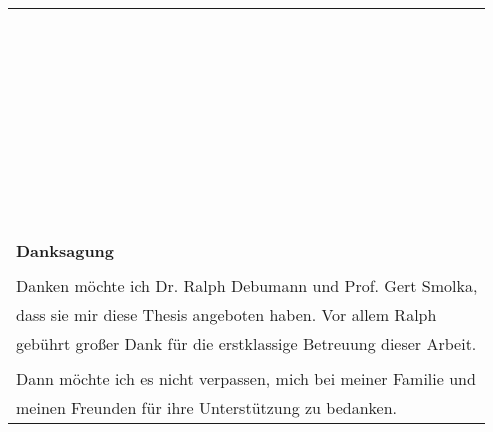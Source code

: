 \begin{titlepage}
\begin{flushleft}
\begin{tabular}{l}
  \end{tabular}
\end{flushleft}

\pagebreak


\pagestyle{empty}

\begin{flushleft}
  \begin{tabular}{l}
    \\\\\\\\\\\\\\\\
    \\\\\\\\\\\\\\\\
    \\\\\\\\\\\\\\\\
    \\\\\\\\\\\\\\\\
    \\\\\\\\\\\\\\
    {\Large{\bf Danksagung}}\\\\
    {\Large{Danken m\"ochte ich Dr. Ralph Debumann und Prof. Gert
        Smolka,}}\\
    {\Large{dass sie mir diese Thesis angeboten haben. Vor allem Ralph}}\\ 
    {\Large{geb\"uhrt gro{\ss}er Dank f\"ur die erstklassige Betreuung dieser Arbeit.}}\\\\
    {\Large{Dann m\"ochte ich es nicht verpassen, mich bei meiner Familie und}}\\
    {\Large{meinen Freunden f\"ur ihre Unterst\"utzung zu bedanken.}}\\
\end{tabular}
\end{flushleft}


\end{titlepage}
